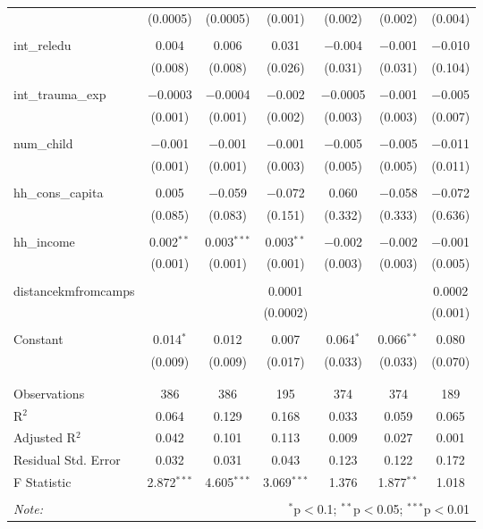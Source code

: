 \begin{table}[H]
\begin{tabular}{@{\extracolsep{4pt}}lcccccc}
  & (0.0005) & (0.0005) & (0.001) & (0.002) & (0.002) & (0.004) \\ 
  & & & & & & \\ 
 int\_reledu & 0.004 & 0.006 & 0.031 & $-$0.004 & $-$0.001 & $-$0.010 \\ 
  & (0.008) & (0.008) & (0.026) & (0.031) & (0.031) & (0.104) \\ 
  & & & & & & \\ 
 int\_trauma\_exp & $-$0.0003 & $-$0.0004 & $-$0.002 & $-$0.0005 & $-$0.001 & $-$0.005 \\ 
  & (0.001) & (0.001) & (0.002) & (0.003) & (0.003) & (0.007) \\ 
  & & & & & & \\ 
 num\_child & $-$0.001 & $-$0.001 & $-$0.001 & $-$0.005 & $-$0.005 & $-$0.011 \\ 
  & (0.001) & (0.001) & (0.003) & (0.005) & (0.005) & (0.011) \\ 
  & & & & & & \\ 
 hh\_cons\_capita & 0.005 & $-$0.059 & $-$0.072 & 0.060 & $-$0.058 & $-$0.072 \\ 
  & (0.085) & (0.083) & (0.151) & (0.332) & (0.333) & (0.636) \\ 
  & & & & & & \\ 
 hh\_income & 0.002$^{**}$ & 0.003$^{***}$ & 0.003$^{**}$ & $-$0.002 & $-$0.002 & $-$0.001 \\ 
  & (0.001) & (0.001) & (0.001) & (0.003) & (0.003) & (0.005) \\ 
  & & & & & & \\ 
 distancekmfromcamps &  &  & 0.0001 &  &  & 0.0002 \\ 
  &  &  & (0.0002) &  &  & (0.001) \\ 
  & & & & & & \\ 
 Constant & 0.014$^{*}$ & 0.012 & 0.007 & 0.064$^{*}$ & 0.066$^{**}$ & 0.080 \\ 
  & (0.009) & (0.009) & (0.017) & (0.033) & (0.033) & (0.070) \\ 
  & & & & & & \\ 
\hline \\[-1.8ex] 
Observations & 386 & 386 & 195 & 374 & 374 & 189 \\ 
R$^{2}$ & 0.064 & 0.129 & 0.168 & 0.033 & 0.059 & 0.065 \\ 
Adjusted R$^{2}$ & 0.042 & 0.101 & 0.113 & 0.009 & 0.027 & 0.001 \\ 
Residual Std. Error & 0.032 & 0.031 & 0.043 & 0.123 & 0.122 & 0.172 \\ 
F Statistic & 2.872$^{***}$ & 4.605$^{***}$ & 3.069$^{***}$ & 1.376 & 1.877$^{**}$ & 1.018 \\ 
\hline 
\hline \\[-1.8ex] 
\textit{Note:}  & \multicolumn{6}{r}{$^{*}$p$<$0.1; $^{**}$p$<$0.05; $^{***}$p$<$0.01} \\ 
\end{tabular} 
\end{table} 
